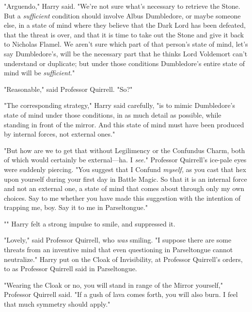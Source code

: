 "Arguendo," Harry said. "We're not sure what's necessary to retrieve the Stone.
But a \emph{sufficient} condition should involve Albus Dumbledore, or maybe
someone else, in a state of mind where they believe that the Dark Lord has been
defeated, that the threat is over, and that it is time to take out the Stone
and give it back to Nicholas Flamel. We aren't sure which part of that person's
state of mind, let's say Dumbledore's, will be the necessary part that he
thinks Lord Voldemort can't understand or duplicate; but under those conditions
Dumbledore's entire state of mind will be \emph{sufficient.}"

"Reasonable," said Professor Quirrell. "So?"

"The corresponding strategy," Harry said carefully, "is to mimic Dumbledore's
state of mind under those conditions, in as much detail as possible, while
standing in front of the mirror. And this state of mind must have been produced
by internal forces, not external ones."

"But how are we to get that without Legilimency or the Confundus Charm, both of
which would certainly be external---ha. I \emph{see.}" Professor Quirrell's
ice-pale eyes were suddenly piercing. "You suggest that I Confund
\emph{myself,} as you cast that hex upon yourself during your first day in
Battle Magic. So that it is an internal force and not an external one, a state
of mind that comes about through only my own choices. Say to me whether you
have made this suggestion with the intention of trapping me, boy. Say it to me
in Parseltongue."

"" Harry felt
a strong impulse to smile, and suppressed it.

"Lovely," said Professor Quirrell, who \emph{was} smiling. "I suppose there are
some threats from an inventive mind that even questioning in Parseltongue
cannot neutralize."
\sbreak
Harry put on the Cloak of Invisibility, at Professor Quirrell's orders, to
 as Professor Quirrell said in Parseltongue.

"Wearing the Cloak or no, you will stand in range of the Mirror yourself,"
Professor Quirrell said. "If a gush of lava comes forth, you will also burn. I
feel that much symmetry should apply."

